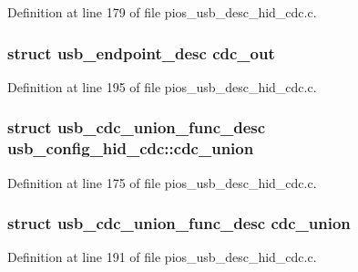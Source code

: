 \-Definition at line 179 of file pios\-\_\-usb\-\_\-desc\-\_\-hid\-\_\-cdc.\-c.

\hypertarget{group___p_i_o_s___u_s_b___d_e_s_c_ga9c39f39e6301c0d93317b2027a769a5a}{
\subsubsection[{cdc\-\_\-out}]{\setlength{\rightskip}{0pt plus 5cm}struct {\bf usb\-\_\-endpoint\-\_\-desc} {\bf cdc\-\_\-out}}}\label{group___p_i_o_s___u_s_b___d_e_s_c_ga9c39f39e6301c0d93317b2027a769a5a}


\-Definition at line 195 of file pios\-\_\-usb\-\_\-desc\-\_\-hid\-\_\-cdc.\-c.

\hypertarget{group___p_i_o_s___u_s_b___d_e_s_c_gafdccd743e5f58edeace549e15f512d44}{
\subsubsection[{cdc\-\_\-union}]{\setlength{\rightskip}{0pt plus 5cm}struct {\bf usb\-\_\-cdc\-\_\-union\-\_\-func\-\_\-desc} {\bf usb\-\_\-config\-\_\-hid\-\_\-cdc\-::cdc\-\_\-union}}}\label{group___p_i_o_s___u_s_b___d_e_s_c_gafdccd743e5f58edeace549e15f512d44}


\-Definition at line 175 of file pios\-\_\-usb\-\_\-desc\-\_\-hid\-\_\-cdc.\-c.

\hypertarget{group___p_i_o_s___u_s_b___d_e_s_c_ga18f1bcfd867862a7b68cf2307ff2df6d}{
\subsubsection[{cdc\-\_\-union}]{\setlength{\rightskip}{0pt plus 5cm}struct {\bf usb\-\_\-cdc\-\_\-union\-\_\-func\-\_\-desc} {\bf cdc\-\_\-union}}}\label{group___p_i_o_s___u_s_b___d_e_s_c_ga18f1bcfd867862a7b68cf2307ff2df6d}


\-Definition at line 191 of file pios\-\_\-usb\-\_\-desc\-\_\-hid\-\_\-cdc.\-c.

